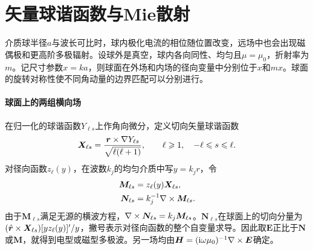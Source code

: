 \section{矢量球谐函数与Mie散射}
\label{sec:Mie scattering}

介质球半径$a$与波长可比时，球内极化电流的相位随位置改变，远场中也会出现磁偶极和更高阶多极辐射。设球外是真空，球内各向同性、均匀且$\mu = \mu_0$，折射率为$m$。记尺寸参数$x = ka$，则球面在外场和内场的径向变量中分别位于$x$和$mx$。球面的旋转对称性使不同角动量的边界匹配可以分别进行。

\paragraph{球面上的两组横向场}
在归一化的球谐函数$Y_{\ell s}$上作角向微分，定义切向矢量球谐函数
\begin{equation}
    \label{eq:ed-vector-spherical-harmonics}
    \bm X_{\ell s} = \frac{\bm r \times \nabla Y_{\ell s}}{\sqrt{\ell(\ell + 1)}},
    \qquad \ell \geqslant 1,\quad -\ell \leqslant s \leqslant \ell .
\end{equation}
对径向函数$z_\ell(y)$，在波数$k_j$的均匀介质中写$y = k_jr$，令
\begin{subequations}
    \label{eq:ed-vector-spherical-waves}
    \begin{align}
        \bm M_{\ell s} &= z_\ell(y)\bm X_{\ell s},\\
        \bm N_{\ell s} &= k_j^{-1}\nabla\times\bm M_{\ell s}.
    \end{align}
\end{subequations}
由于$\bm M_{\ell s}$满足无源的横波方程，$\nabla\times\bm N_{\ell s} = k_j\bm M_{\ell s}$。$\bm N_{\ell s}$在球面上的切向分量为$(\mathop{}\!\hat{\bm{r}} \times \bm X_{\ell s})[y z_\ell(y)]'/y$，撇号表示对径向函数的整个自变量求导。因此取$\bm E$正比于$\bm N$或$\bm M$，就得到电型或磁型多极波。另一场均由$\bm H = (\mathrm{i}\omega\mu_0)^{-1}\nabla\times\bm E$确定。

